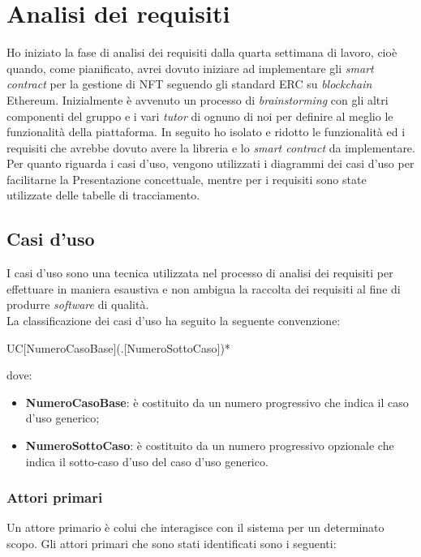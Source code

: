 
\section{Analisi dei requisiti}
Ho iniziato la fase di analisi dei requisiti dalla quarta settimana di lavoro, cioè quando, come pianificato, avrei dovuto iniziare ad implementare gli \textit{smart contract} per la gestione di NFT seguendo gli standard ERC su \textit{blockchain} Ethereum. Inizialmente è avvenuto un processo di \textit{brainstorming} con gli altri componenti del gruppo e i vari \textit{tutor} di ognuno di noi per definire al meglio le funzionalità della piattaforma. In seguito ho isolato e ridotto le funzionalità ed i requisiti che avrebbe dovuto avere la libreria e lo \textit{smart contract} da implementare. Per quanto riguarda i casi d'uso, vengono utilizzati i diagrammi dei casi d'uso per facilitarne la Presentazione concettuale, mentre per i requisiti sono state utilizzate delle tabelle di tracciamento. 

\subsection{Casi d'uso}
I casi d'uso sono una tecnica utilizzata nel processo di analisi dei requisiti per effettuare in maniera esaustiva e non ambigua la raccolta dei requisiti al fine di produrre \textit{software} di qualità. \\

\noindent La classificazione dei casi d'uso ha seguito la seguente convenzione:
\begin{center}
  UC[NumeroCasoBase](.[NumeroSottoCaso])*
\end{center}
dove:
\begin{itemize}
  \item \textbf{NumeroCasoBase}: è costituito da un numero progressivo che indica il caso d'uso generico;
  \item \textbf{NumeroSottoCaso}: è costituito da un numero progressivo opzionale che indica il sotto-caso d'uso del caso
  d'uso generico.
\end{itemize}

\subsubsection{Attori primari}
Un attore primario è colui che interagisce con il sistema per un determinato scopo.
Gli attori primari che sono stati identificati sono i seguenti:


